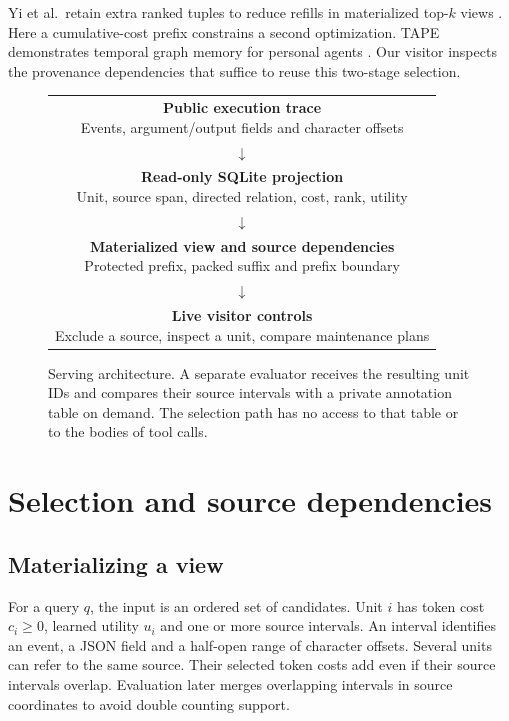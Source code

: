 \documentclass[conference]{IEEEtran}
\begin{document}
Yi et al.\ retain extra ranked tuples to reduce refills in materialized top-$k$ views \cite{topk}. Here a cumulative-cost prefix constrains a second optimization. TAPE demonstrates temporal graph memory for personal agents \cite{tape}. Our visitor inspects the provenance dependencies that suffice to reuse this two-stage selection.

\begin{figure}[t]
\centering
\setlength{\fboxsep}{4pt}
\begin{tabular}{@{}c@{}}
\fcolorbox{forest}{white}{\parbox{.88\columnwidth}{\centering \textbf{Public execution trace}\\Events, argument/output fields and character offsets}}\\[-1pt]
$\downarrow$\\[-2pt]
\fcolorbox{forest}{white}{\parbox{.88\columnwidth}{\centering \textbf{Read-only SQLite projection}\\Unit, source span, directed relation, cost, rank, utility}}\\[-1pt]
$\downarrow$\\[-2pt]
\fcolorbox{forest}{white}{\parbox{.88\columnwidth}{\centering \textbf{Materialized view and source dependencies}\\Protected prefix, packed suffix and prefix boundary}}\\[-1pt]
$\downarrow$\\[-2pt]
\fcolorbox{forest}{white}{\parbox{.88\columnwidth}{\centering \textbf{Live visitor controls}\\Exclude a source, inspect a unit, compare maintenance plans}}\\
\end{tabular}
\caption{Serving architecture. A separate evaluator receives the resulting unit IDs and compares their source intervals with a private annotation table on demand. The selection path has no access to that table or to the bodies of tool calls.}
\label{fig:system}
\end{figure}

\section{Selection and source dependencies}

\subsection{Materializing a view}
For a query $q$, the input is an ordered set of candidates. Unit $i$ has token cost $c_i\geq 0$, learned utility $u_i$ and one or more source intervals. An interval identifies an event, a JSON field and a half-open range of character offsets. Several units can refer to the same source. Their selected token costs add even if their source intervals overlap. Evaluation later merges overlapping intervals in source coordinates to avoid double counting support.
\end{document}
